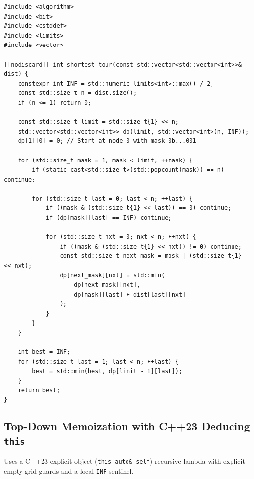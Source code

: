 \documentclass[11pt,a4paper]{article}
\theoremstyle{definition}
\begin{document}
\begin{lstlisting}[caption={Shortest Hamiltonian path from node 0 using bitmask DP}]
#include <algorithm>
#include <bit>
#include <cstddef>
#include <limits>
#include <vector>

[[nodiscard]] int shortest_tour(const std::vector<std::vector<int>>& dist) {
    constexpr int INF = std::numeric_limits<int>::max() / 2;
    const std::size_t n = dist.size();
    if (n <= 1) return 0;

    const std::size_t limit = std::size_t{1} << n;
    std::vector<std::vector<int>> dp(limit, std::vector<int>(n, INF));
    dp[1][0] = 0; // Start at node 0 with mask 0b...001

    for (std::size_t mask = 1; mask < limit; ++mask) {
        if (static_cast<std::size_t>(std::popcount(mask)) == n) continue;

        for (std::size_t last = 0; last < n; ++last) {
            if ((mask & (std::size_t{1} << last)) == 0) continue;
            if (dp[mask][last] == INF) continue;

            for (std::size_t nxt = 0; nxt < n; ++nxt) {
                if ((mask & (std::size_t{1} << nxt)) != 0) continue;
                const std::size_t next_mask = mask | (std::size_t{1} << nxt);
                dp[next_mask][nxt] = std::min(
                    dp[next_mask][nxt],
                    dp[mask][last] + dist[last][nxt]
                );
            }
        }
    }

    int best = INF;
    for (std::size_t last = 1; last < n; ++last) {
        best = std::min(best, dp[limit - 1][last]);
    }
    return best;
}
\end{lstlisting}

\subsection{Top-Down Memoization with C++23 Deducing \texorpdfstring{\texttt{this}}{this}}
Uses a C++23 explicit-object (\texttt{this auto\& self}) recursive lambda with explicit empty-grid guards and a local \texttt{INF} sentinel.
\end{document}
